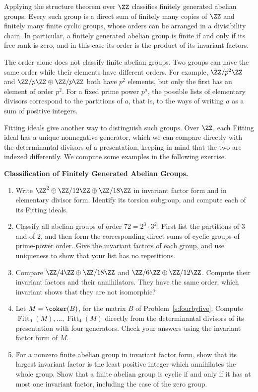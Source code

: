 \documentclass[12pt,reqno]{amsart}
\DeclareMathOperator{\Fitt}{Fitt}
\begin{document}
\hrulefill

Applying the structure theorem over $\ZZ$ classifies finitely generated abelian groups. Every such group is a direct sum of finitely many copies of $\ZZ$ and finitely many finite cyclic groups, whose orders can be arranged in a divisibility chain. In particular, a finitely generated abelian group is finite if and only if its free rank is zero, and in this case its order is the product of its invariant factors.

The order alone does not classify finite abelian groups. Two groups can have the same order while their elements have different orders. For example, $\ZZ/p^2\ZZ$ and $\ZZ/p\ZZ\oplus\ZZ/p\ZZ$ both have $p^2$ elements, but only the first has an element of order $p^2$. For a fixed prime power $p^a$, the possible lists of elementary divisors correspond to the partitions of $a$, that is, to the ways of writing $a$ as a sum of positive integers.

Fitting ideals give another way to distinguish such groups. Over $\ZZ$, each Fitting ideal has a unique nonnegative generator, which we can compare directly with the determinantal divisors of a presentation, keeping in mind that the two are indexed differently. We compute some examples in the following exercise.

\hrulefill

\begin{problems}
\item\label{s:abelian} \textbf{Classification of Finitely Generated Abelian Groups.}
\begin{enumerate}
\item Write $\ZZ^2\oplus\ZZ/12\ZZ\oplus\ZZ/18\ZZ$ in invariant factor form and in elementary divisor form. Identify its torsion subgroup, and compute each of its Fitting ideals.
\item Classify all abelian groups of order $72=2^3\cdot3^2$. First list the partitions of $3$ and of $2$, and then form the corresponding direct sums of cyclic groups of prime-power order. Give the invariant factors of each group, and use uniqueness to show that your list has no repetitions.
\item Compare $\ZZ/4\ZZ\oplus\ZZ/18\ZZ$ and $\ZZ/6\ZZ\oplus\ZZ/12\ZZ$. Compute their invariant factors and their annihilators. They have the same order; which invariant shows that they are not isomorphic?
\item Let $M=\coker(B)$, for the matrix $B$ of Problem~\ref{s:fourbyfive}. Compute $\Fitt_0(M),\ldots,\Fitt_4(M)$ directly from the determinantal divisors of its presentation with four generators. Check your answers using the invariant factor form of $M$.
\item For a nonzero finite abelian group in invariant factor form, show that its largest invariant factor is the least positive integer which annihilates the whole group. Show that a finite abelian group is cyclic if and only if it has at most one invariant factor, including the case of the zero group.
\end{enumerate}
\end{problems}
\end{document}
